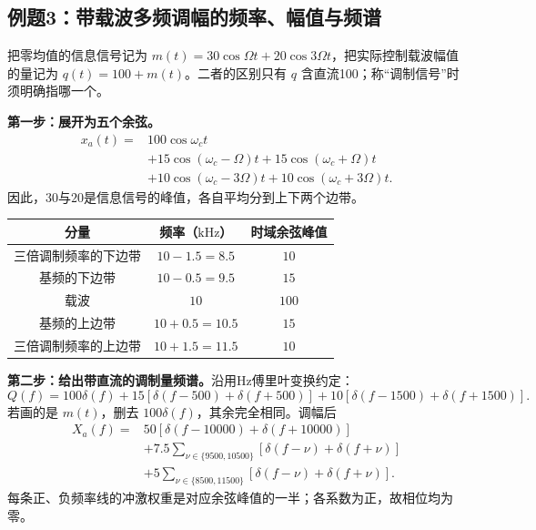 
\clearpage
\subsection{例题3：带载波多频调幅的频率、幅值与频谱}


\sol
把零均值的信息信号记为 $m(t)=30\cos\Omega t+20\cos3\Omega t$，把实际控制载波幅值的量记为 $q(t)=100+m(t)$。二者的区别只有 $q$ 含直流100；称“调制信号”时须明确指哪一个。

\textbf{第一步：展开为五个余弦。}
\begin{align*}
x_a(t)={}&100\cos\omega_ct\\
&+15\cos(\omega_c-\Omega)t+15\cos(\omega_c+\Omega)t\\
&+10\cos(\omega_c-3\Omega)t+10\cos(\omega_c+3\Omega)t.
\end{align*}
因此，$30$与$20$是信息信号的峰值，各自平均分到上下两个边带。

\begin{table}[H]
\centering
\begin{tabular}{@{}c c c@{}}
\toprule
分量 & 频率（$\mathrm{kHz}$） & 时域余弦峰值 \\
\midrule
三倍调制频率的下边带 & $10-1.5=8.5$ & $10$ \\
基频的下边带 & $10-0.5=9.5$ & $15$ \\
载波 & $10$ & $100$ \\
基频的上边带 & $10+0.5=10.5$ & $15$ \\
三倍调制频率的上边带 & $10+1.5=11.5$ & $10$ \\
\bottomrule
\end{tabular}
\end{table}

\textbf{第二步：给出带直流的调制量频谱。}沿用Hz傅里叶变换约定：
\[
Q(f)=100\delta(f)+15[\delta(f-500)+\delta(f+500)]
+10[\delta(f-1500)+\delta(f+1500)].
\]
若画的是 $m(t)$，删去 $100\delta(f)$，其余完全相同。调幅后
\begin{align*}
X_a(f)={}&50[\delta(f-10000)+\delta(f+10000)]\\
&+7.5\!\!\sum_{\nu\in\{9500,10500\}}[\delta(f-\nu)+\delta(f+\nu)]\\
&+5\!\!\sum_{\nu\in\{8500,11500\}}[\delta(f-\nu)+\delta(f+\nu)].
\end{align*}
每条正、负频率线的冲激权重是对应余弦峰值的一半；各系数为正，故相位均为零。

